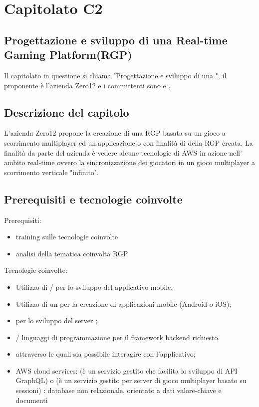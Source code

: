 \section{Capitolato C2}
\subsection{Progettazione e sviluppo di una Real-time Gaming Platform(RGP)}
Il capitolato in questione si chiama "Progettazione e sviluppo di una ", il proponente è l'azienda Zero12 e i committenti sono \VT{} e \CR{}.

\subsection{Descrizione del capitolo}
L’azienda Zero12 propone la creazione di una RGP basata su un gioco a scorrimento multiplayer ed un'applicazione  o  con finalità di  della RGP creata.
La finalità da parte del azienda è vedere alcune tecnologie di AWS in azione nell' ambito real-time ovvero la sincronizzazione dei giocatori in un gioco multiplayer a scorrimento verticale "infinito".
\subsection{Prerequisiti e tecnologie coinvolte}
Prerequisiti:
\begin{itemize}
\item training sulle tecnologie coinvolte
\item analisi della tematica coinvolta RGP 
\end{itemize}
Tecnologie coinvolte:
\begin{itemize}
\item Utilizzo di / per lo sviluppo del applicativo mobile.
\item Utilizzo di un  per la creazione di applicazioni mobile (Android o iOS);
\item {} per lo sviluppo del server ;
\item {}/ linguaggi di programmazione per il framework backend richiesto.
\item {}  attraverso le quali sia possibile interagire con l'applicativo;
\item AWS cloud services: 
(è un servizio gestito che facilita lo sviluppo di API GraphQL) o (è un servizio gestito per server di gioco multiplayer basato su sessioni) 
: database non relazionale, orientato a dati valore-chiave e documenti
\end{itemize}

